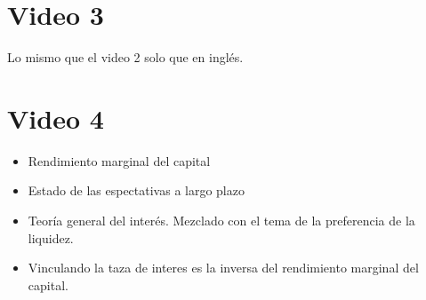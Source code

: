 \documentclass{article}
\begin{document}
\section{Video 3}
Lo mismo que el video 2 solo que en inglés.

\section{Video 4}
\begin{itemize}
    \item Rendimiento marginal del capital
    \item Estado de las espectativas a largo plazo
    \item Teoría general del interés. Mezclado con el tema de la preferencia de la liquidez.
    \item Vinculando la taza de interes es la inversa del rendimiento marginal del capital. 
\end{itemize}


\end{document}

